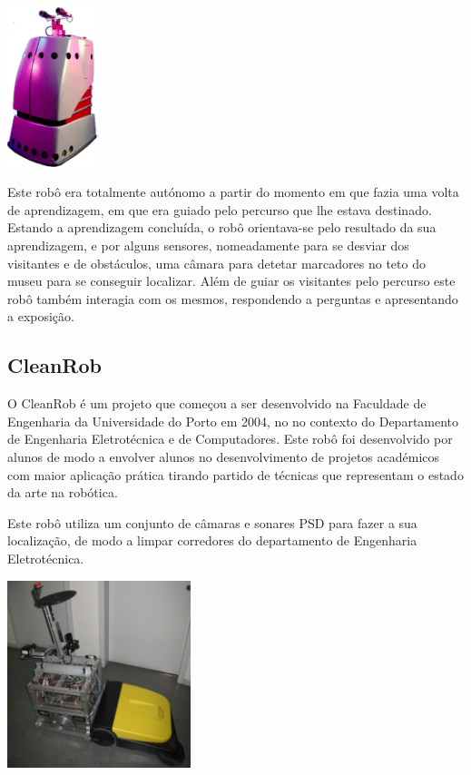 \begin{center}
	\includegraphics[width=0.20\textwidth]{./figures/minerva.png}
	\label{fig:4}
\end{center}

Este robô era totalmente autónomo a partir do momento em que fazia uma volta de
aprendizagem, em que era guiado pelo percurso que lhe estava destinado. Estando
a aprendizagem concluída, o robô orientava-se pelo resultado da sua aprendizagem, e por alguns sensores, nomeadamente para se desviar dos visitantes e de obstáculos, uma câmara para detetar marcadores no teto do museu para se conseguir localizar.
Além de guiar os visitantes pelo percurso este robô também interagia com os mesmos, respondendo a perguntas e apresentando a exposição.

\subsection{CleanRob}

O CleanRob é um projeto que começou a ser desenvolvido na Faculdade de Engenharia da Universidade do Porto em 2004, no no contexto do Departamento de Engenharia Eletrotécnica e de Computadores. Este robô foi desenvolvido por alunos de modo a envolver alunos no desenvolvimento de projetos académicos com maior aplicação prática tirando partido de técnicas que representam o estado da arte na robótica.

Este robô utiliza um conjunto de câmaras e sonares PSD para fazer a sua localização, de modo a limpar corredores do departamento de Engenharia Eletrotécnica.

\begin{center}
	\includegraphics[width=0.40\textwidth]{./figures/clean_rob.jpg}
	\label{fig:6}
\end{center}



